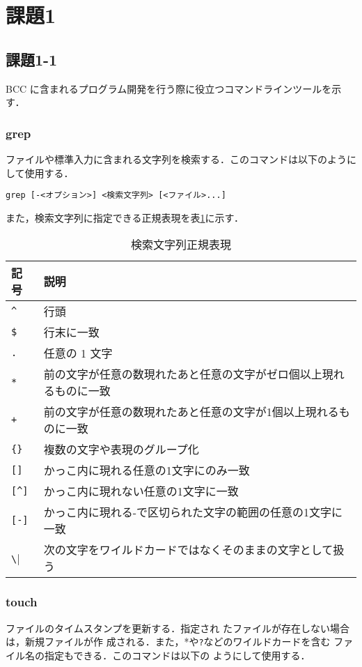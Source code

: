 \documentclass[twocolumn]{jsarticle}%
\begin{document}
\section{課題1}
\subsection{課題1-1}
BCC に含まれるプログラム開発を行う際に役立つコマンドラインツールを示す．

\subsubsection{grep}
ファイルや標準入力に含まれる文字列を検索する．このコマンドは以下のようにして使用する．
\begin{lstlisting}[numbers=none]
grep [-<オプション>] <検索文字列> [<ファイル>...]
\end{lstlisting}
また，検索文字列に指定できる正規表現を表\ref{tb:grep}に示す．

\renewcommand{\arraystretch}{0.8}
\begin{table}[htbp]
  \caption{検索文字列正規表現} \label{tb:grep}
  \begin{center}
    \begin{tabular}{l|p{6cm}}\hline
記号 & 説明 \\\hline
\verb|^| & 行頭\\
\verb|$| & 行末に一致\\
\verb|.| & 任意の 1 文字\\
\verb|*| & 前の文字が任意の数現れたあと任意の文字がゼロ個以上現れるものに一致\\
\verb|+| & 前の文字が任意の数現れたあと任意の文字が1個以上現れるものに一致\\
\verb|{}| & 複数の文字や表現のグループ化\\
\verb|[]| & かっこ内に現れる任意の1文字にのみ一致\\
\verb|[^]| & かっこ内に現れない任意の1文字に一致\\
\verb|[-]| & かっこ内に現れる-で区切られた文字の範囲の任意の1文字に一致\\
\verb|\| & 次の文字をワイルドカードではなくそのままの文字として扱う\\
    \hline
    \end{tabular}
  \end{center}
\end{table}

\subsubsection{touch}
ファイルのタイムスタンプを更新する．指定され
たファイルが存在しない場合は，新規ファイルが作
成される．また，*や\verb|?|などのワイルドカードを含む
ファイル名の指定もできる．このコマンドは以下の
ようにして使用する．
\end{document}
